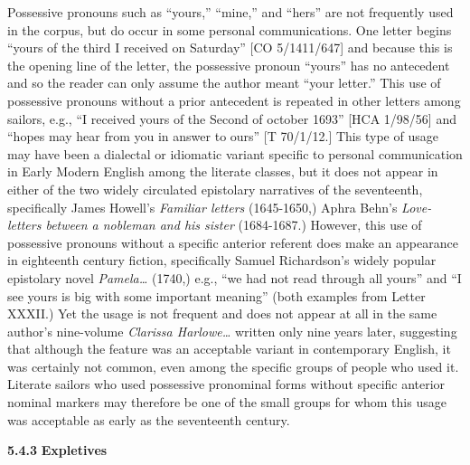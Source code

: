   Possessive pronouns such as “yours,” “mine,” and “hers” are not frequently used in the corpus, but do occur in some personal communications. One letter begins “yours of the third I received on Saturday” [CO 5/1411/647] and because this is the opening line of the letter, the possessive pronoun “yours” has no antecedent and so the reader can only assume the author meant “your letter.” This use of possessive pronouns without a prior antecedent is repeated in other letters among sailors, e.g., “I received yours of the Second of october 1693” [HCA 1/98/56] and “hopes may hear from you in answer to ours” [T 70/1/12.] This type of usage may have been a dialectal or idiomatic variant specific to personal communication in Early Modern English among the literate classes, but it does not appear in either of the two widely circulated epistolary narratives of the seventeenth, specifically James Howell’s \textit{Familiar letters} (1645-1650,) Aphra Behn’s \textit{Love-letters between a nobleman and his sister} (1684-1687.) However, this use of possessive pronouns without a specific anterior referent does make an appearance in eighteenth century fiction, specifically Samuel Richardson’s widely popular epistolary novel \textit{Pamela…} (1740,) e.g., “we had not read through all yours” and “I see yours is big with some important meaning” (both examples from Letter XXXII.) Yet the usage is not frequent and does not appear at all in the same author’s nine-volume \textit{Clarissa Harlowe…} written only nine years later, suggesting that although the feature was an acceptable variant in contemporary English, it was certainly not common, even among the specific groups of people who used it. Literate sailors who used possessive pronominal forms without specific anterior nominal markers may therefore be one of the small groups for whom this usage was acceptable as early as the seventeenth century. 

\textbf{5.4.3} \textbf{Expletives}

